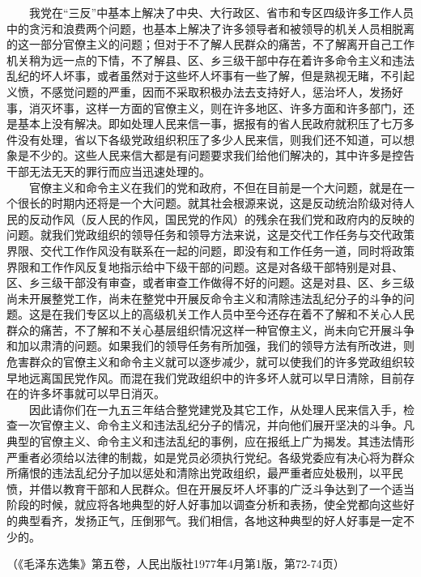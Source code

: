\documentclass[cn,11pt,chinese]{elegantbook}
\begin{document}
　　我党在“三反”中基本上解决了中央、大行政区、省市和专区四级许多工作人员中的贪污和浪费两个问题，也基本上解决了许多领导者和被领导的机关人员相脱离的这一部分官僚主义的问题；但对于不了解人民群众的痛苦，不了解离开自己工作机关稍为远一点的下情，不了解县、区、乡三级干部中存在着许多命令主义和违法乱纪的坏人坏事，或者虽然对于这些坏人坏事有一些了解，但是熟视无睹，不引起义愤，不感觉问题的严重，因而不采取积极办法去支持好人，惩治坏人，发扬好事，消灭坏事，这样一方面的官僚主义，则在许多地区、许多方面和许多部门，还是基本上没有解决。即如处理人民来信一事，据报有的省人民政府就积压了七万多件没有处理，省以下各级党政组织积压了多少人民来信，则我们还不知道，可以想象是不少的。这些人民来信大都是有问题要求我们给他们解决的，其中许多是控告干部无法无天的罪行而应当迅速处理的。\\
　　官僚主义和命令主义在我们的党和政府，不但在目前是一个大问题，就是在一个很长的时期内还将是一个大问题。就其社会根源来说，这是反动统治阶级对待人民的反动作风（反人民的作风，国民党的作风）的残余在我们党和政府内的反映的问题。就我们党政组织的领导任务和领导方法来说，这是交代工作任务与交代政策界限、交代工作作风没有联系在一起的问题，即没有和工作任务一道，同时将政策界限和工作作风反复地指示给中下级干部的问题。这是对各级干部特别是对县、区、乡三级干部没有审查，或者审查工作做得不好的问题。这是对县、区、乡三级尚未开展整党工作，尚未在整党中开展反命令主义和清除违法乱纪分子的斗争的问题。这是在我们专区以上的高级机关工作人员中至今还存在着不了解和不关心人民群众的痛苦，不了解和不关心基层组织情况这样一种官僚主义，尚未向它开展斗争和加以肃清的问题。如果我们的领导任务有所加强，我们的领导方法有所改进，则危害群众的官僚主义和命令主义就可以逐步减少，就可以使我们的许多党政组织较早地远离国民党作风。而混在我们党政组织中的许多坏人就可以早日清除，目前存在的许多坏事就可以早日消灭。\\
　　因此请你们在一九五三年结合整党建党及其它工作，从处理人民来信入手，检查一次官僚主义、命令主义和违法乱纪分子的情况，并向他们展开坚决的斗争。凡典型的官僚主义、命令主义和违法乱纪的事例，应在报纸上广为揭发。其违法情形严重者必须给以法律的制裁，如是党员必须执行党纪。各级党委应有决心将为群众所痛恨的违法乱纪分子加以惩处和清除出党政组织，最严重者应处极刑，以平民愤，并借以教育干部和人民群众。但在开展反坏人坏事的广泛斗争达到了一个适当阶段的时候，就应将各地典型的好人好事加以调查分析和表扬，使全党都向这些好的典型看齐，发扬正气，压倒邪气。我们相信，各地这种典型的好人好事是一定不少的。\\
\begin{flushright}（《毛泽东选集》第五卷，人民出版社1977年4月第1版，第72-74页）\end{flushright}
\end{document}
